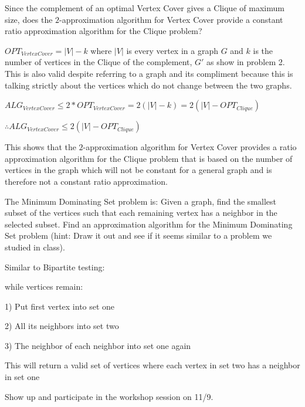 \documentclass[12pt]{article}
\newenvironment{problem}[2][Problem]
{\begin{trivlist}
\item[\hskip \labelsep {\bfseries #1}\hskip \labelsep {\bfseries #2.}]}{\end{trivlist}}
\begin{document}
\begin{problem}{3}
Since the complement of an optimal Vertex Cover gives a Clique of maximum size, does the $2$-approximation algorithm for Vertex Cover provide a constant ratio approximation algorithm for the Clique problem?


$OPT_{Vertex Cover} = |V| - k$ where $|V|$ is every vertex in a graph $G$ and $k$ is the number of vertices in the Clique of the complement, $G'$ as show in problem 2. This is also valid despite referring to a graph and its compliment because this is talking strictly about the vertices which do not change between the two graphs.

$ALG_{Vertex Cover} \le 2*OPT_{Vertex Cover} = 2(|V| - k) = 2(|V| - OPT_{Clique})$

$\therefore ALG_{Vertex Cover} \le 2(|V| - OPT_{Clique})$

This shows that the $2$-approximation algorithm for Vertex Cover provides a ratio approximation algorithm for the Clique problem that is based on the number of vertices in the graph which will not be constant for a general graph and is therefore not a constant ratio approximation.
\end{problem}


\begin{problem}{4*}
The Minimum Dominating Set problem is: Given a graph, find the smallest subset of the vertices such that each remaining vertex has a neighbor in the selected subset. Find an approximation algorithm for the Minimum Dominating Set problem (hint: Draw it out and see if it seems similar to a problem we studied in class).

Similar to Bipartite testing:

while vertices remain:

1) Put first vertex into set one

2) All its neighbors into set two

3) The neighbor of each neighbor into set one again

This will return a valid set of vertices where each vertex in set two has a neighbor in set one

\end{problem}


\begin{problem}{5}
Show up and participate in the workshop session on 11/9.
\end{problem}
\end{document}
